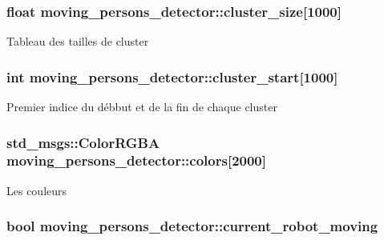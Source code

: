 \subsubsection[{\texorpdfstring{cluster\+\_\+size}{cluster_size}}]{\setlength{\rightskip}{0pt plus 5cm}float moving\+\_\+persons\+\_\+detector\+::cluster\+\_\+size\mbox{[}1000\mbox{]}\hspace{0.3cm}{\ttfamily [private]}}\hypertarget{classmoving__persons__detector_ace70d87779974b46c12273865b36ccf1}{}\label{classmoving__persons__detector_ace70d87779974b46c12273865b36ccf1}
Tableau des tailles de cluster 
\subsubsection[{\texorpdfstring{cluster\+\_\+start}{cluster_start}}]{\setlength{\rightskip}{0pt plus 5cm}int moving\+\_\+persons\+\_\+detector\+::cluster\+\_\+start\mbox{[}1000\mbox{]}\hspace{0.3cm}{\ttfamily [private]}}\hypertarget{classmoving__persons__detector_aa8bb9b30e452cb90530b96328f07d54a}{}\label{classmoving__persons__detector_aa8bb9b30e452cb90530b96328f07d54a}
Premier indice du débbut et de la fin de chaque cluster 
\subsubsection[{\texorpdfstring{colors}{colors}}]{\setlength{\rightskip}{0pt plus 5cm}std\+\_\+msgs\+::\+Color\+R\+G\+BA moving\+\_\+persons\+\_\+detector\+::colors\mbox{[}2000\mbox{]}\hspace{0.3cm}{\ttfamily [private]}}\hypertarget{classmoving__persons__detector_af658a75f3cf4bd684fb2a282ce52af04}{}\label{classmoving__persons__detector_af658a75f3cf4bd684fb2a282ce52af04}
Les couleurs 
\subsubsection[{\texorpdfstring{current\+\_\+robot\+\_\+moving}{current_robot_moving}}]{\setlength{\rightskip}{0pt plus 5cm}bool moving\+\_\+persons\+\_\+detector\+::current\+\_\+robot\+\_\+moving\hspace{0.3cm}{\ttfamily [private]}}\hypertarget{classmoving__persons__detector_ac3e2309e03a591892b8b13ba51df6831}{}\label{classmoving__persons__detector_ac3e2309e03a591892b8b13ba51df6831}
